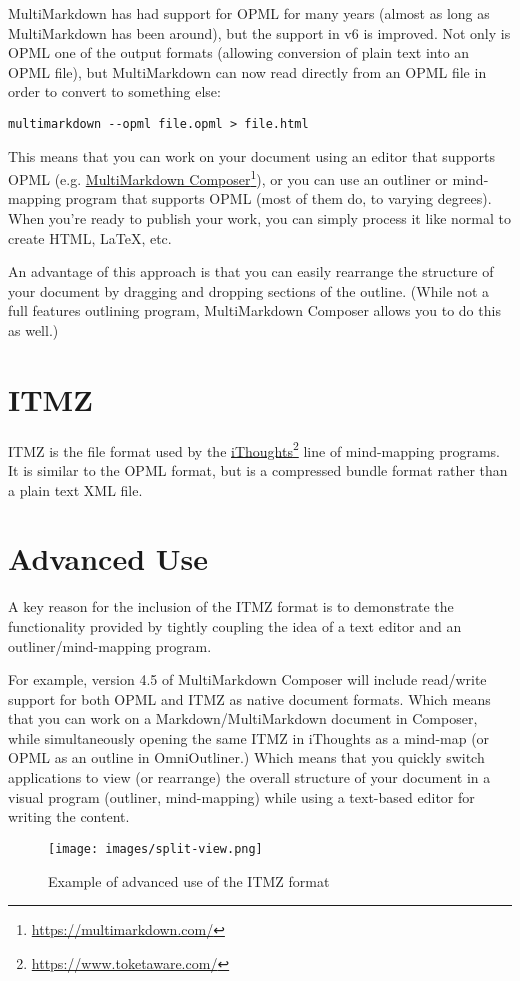 MultiMarkdown has had support for OPML for many years (almost as long as MultiMarkdown has been around), but the support in v6 is improved. Not only is OPML one of the output formats (allowing conversion of plain text into an OPML file), but MultiMarkdown can now read directly from an OPML file in order to convert to something else:

\begin{verbatim}
multimarkdown --opml file.opml > file.html
\end{verbatim}

This means that you can work on your document using an editor that supports OPML (e.g. \href{https://multimarkdown.com/}{MultiMarkdown Composer}\footnote{\href{https://multimarkdown.com/}{https:\slash{}\slash{}multimarkdown.com\slash{}}}), or you can use an outliner or mind-mapping program that supports OPML (most of them do, to varying degrees). When you're ready to publish your work, you can simply process it like normal to create HTML, LaTeX, etc.

An advantage of this approach is that you can easily rearrange the structure of your document by dragging and dropping sections of the outline. (While not a full features outlining program, MultiMarkdown Composer allows you to do this as well.)

\section{ITMZ}
\label{itmz}

ITMZ is the file format used by the \href{https://www.toketaware.com/}{iThoughts}\footnote{\href{https://www.toketaware.com/}{https:\slash{}\slash{}www.toketaware.com\slash{}}} line of mind-mapping programs. It is similar to the OPML format, but is a compressed bundle format rather than a plain text XML file.

\section{Advanced Use}
\label{advanceduse}

A key reason for the inclusion of the ITMZ format is to demonstrate the functionality provided by tightly coupling the idea of a text editor and an outliner\slash{}mind-mapping program.

For example, version 4.5 of MultiMarkdown Composer will include read\slash{}write support for both OPML and ITMZ as native document formats. Which means that you can work on a Markdown\slash{}MultiMarkdown document in Composer, while simultaneously opening the same ITMZ in iThoughts as a mind-map (or OPML as an outline in OmniOutliner.) Which means that you quickly switch applications to view (or rearrange) the overall structure of your document in a visual program (outliner, mind-mapping) while using a text-based editor for writing the content.

\begin{figure}[htbp]
\centering
\texttt{[image: images/split-view.png]}
\caption{Example of advanced use of the ITMZ format}
\end{figure}



